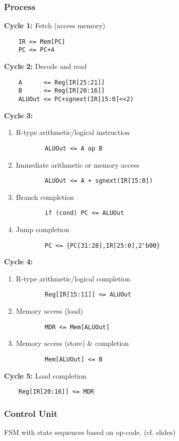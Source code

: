 \documentclass{article}
\begin{document}
\subsubsection{Process}
\textbf{Cycle 1:} Fetch (access memory)
\begin{verbatim}
	IR <= Mem[PC]
	PC <= PC+4
\end{verbatim}
\textbf{Cycle 2:} Decode and read
\begin{verbatim}
	A      <= Reg[IR[25:21]]
	B      <= Reg[IR[20:16]]
	ALUOut <= PC+sgnext(IR[15:0]<<2)
\end{verbatim}
\textbf{Cycle 3:}
\begin{enumerate}
	\item R-type arithmetic/logical instruction \begin{verbatim}
		ALUOut <= A op B
	\end{verbatim}
	\item Immediate arithmetic or memory access \begin{verbatim}
		ALUOut <= A + sgnext(IR[15:0])
	\end{verbatim}
	\item Branch completion \begin{verbatim}
		if (cond) PC <= ALUOut
	\end{verbatim}
	\item Jump completion \begin{verbatim}
		PC <= {PC[31:28],IR[25:0],2'b00}
	\end{verbatim}
\end{enumerate}
\textbf{Cycle 4:}
\begin{enumerate}
	\item R-type arithmetic/logical completion \begin{verbatim}
		Reg[IR[15:11]] <= ALUOut
	\end{verbatim}
	\item Memory access (load) \begin{verbatim}
		MDR <= Mem[ALUOut]
	\end{verbatim}
	\item Memory access (store) \& completion \begin{verbatim}
		Mem[ALUOut] <= B
	\end{verbatim}
\end{enumerate}
\textbf{Cycle 5:} Load completion
\begin{verbatim}
	Reg[IR[20:16]] <= MDR
\end{verbatim}
\subsubsection{Control Unit}
FSM with state sequences based on op-code. (cf. slides)
\end{document}
